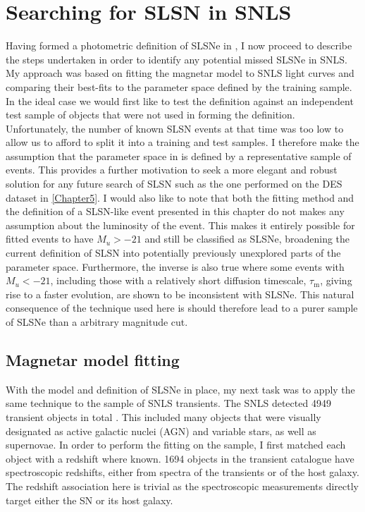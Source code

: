 \section{Searching for SLSN in SNLS}
Having formed a photometric definition of SLSNe in , I now proceed to describe the steps undertaken in order to identify any potential missed SLSNe in SNLS. My approach was based on fitting the magnetar model to SNLS light curves and comparing their best-fits to the parameter space defined by the training sample. In the ideal case we would first like to test the definition against an independent test sample of objects that were not used in forming the definition. Unfortunately, the number of known SLSN events at that time was too low to allow us to afford to split it into a training and test samples. I therefore make the assumption that the parameter space in  is defined by a representative sample of events. This provides a further motivation to seek a more elegant and robust solution for any future search of SLSN such as the one performed on the DES dataset in \cref{Chapter5}. I would also like to note that both the fitting method and the definition of a SLSN-like event presented in this chapter do not makes any assumption about the luminosity of the event. This makes it entirely possible for fitted events to have $M_u>-21$ and still be classified as SLSNe, broadening the current definition of SLSN into potentially previously unexplored parts of the parameter space. Furthermore, the inverse is also true where some events with $M_u<-21$, including those with a relatively short diffusion timescale, $\tau_\mathrm{m}$, giving rise to a faster evolution, are shown to be inconsistent with SLSNe. This natural consequence of the technique used here is should therefore lead to a purer sample of SLSNe than a arbitrary magnitude cut.

\subsection{Magnetar model fitting}
With the model and definition of SLSNe in place, my next task was to apply the same technique to the sample of SNLS transients. The SNLS detected 4949 transient objects in total \citep{Perrett2010}. This included many objects that were visually designated as active galactic nuclei (AGN) and variable stars, as well as supernovae. In order to perform the fitting on the sample, I first matched each object with a redshift where known. 1694 objects in the transient catalogue have spectroscopic redshifts, either from spectra of the transients or of the host galaxy. The redshift association here is trivial as the spectroscopic measurements directly target either the SN or its host galaxy.

